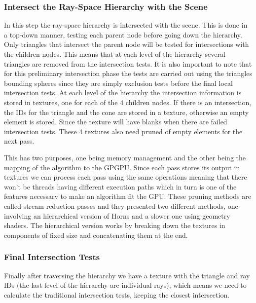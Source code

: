 \documentclass{llncs}
\begin{document}
\subsubsection{Intersect the Ray-Space Hierarchy with the Scene}

In this step the ray-space hierarchy is intersected with the scene. This is done in a top-down manner, testing each parent node before going down the hierarchy. Only triangles that intersect the parent node will be tested for intersections with the children nodes. This means that at each level of the hierarchy several triangles are removed from the intersection tests. It is also important to note that for this preliminary intersection phase the tests are carried out using the triangles bounding spheres since they are simply exclusion tests before the final local intersection tests. At each level of the hierarchy the intersection information is stored in textures, one for each of the 4 children nodes. If there is an intersection, the IDs for the triangle and the cone are stored in a texture, otherwise an empty element is stored. Since the texture will have blanks when there are failed intersection tests. These 4 textures also need pruned of empty elements  for the next pass.

\medskip

This has two purposes, one being memory management and the other being the mapping of the algorithm to the GPGPU. Since each pass stores its output in textures we can process each pass using the same operations meaning that there won't be threads having different execution paths which in turn is one of the features necessary to make an algorithm fit the GPU. These pruning methods are called stream-reduction passes and they presented two different methods, one involving an hierarchical version of Horns \cite{Horn05} and a slower one using geometry shaders. The hierarchical version works by breaking down the textures in components of fixed size and concatenating them at the end.

\subsubsection{Final Intersection Tests}	

Finally after traversing the hierarchy we have a texture with the triangle and  ray IDs (the last level of the hierarchy are individual rays), which means we need to calculate the traditional intersection tests, keeping the closest intersection.
\end{document}
